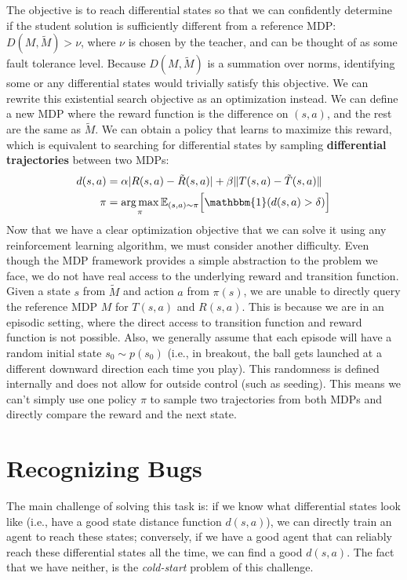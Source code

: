 \documentclass{article}
\newcommand{\E}{\mathbb{E}}
\DeclareMathOperator*{\argmax}{arg\,max}
\newcommand{\PIECH}[1]{#1}%
\begin{document}
The objective is to reach differential states so that we can confidently \PIECH{determine if the student solution is sufficiently different from a reference MDP:} $D(M, \tilde M) > \nu$, where $\nu$ is chosen by the teacher, and can be thought of as some fault tolerance level. Because $D(M, \tilde M)$ is a summation over norms, identifying some or any differential states would trivially satisfy this objective. We can rewrite this existential search objective as an optimization instead. We can define a new MDP where the reward function is the difference on $(s, a)$, and the rest are the same as $\tilde M$. We can obtain a policy that learns to maximize this reward, which is equivalent to searching for differential states by sampling \textbf{differential trajectories} between two MDPs: 
\begin{align}
d(s, a) &= \alpha |R(s, a) - \tilde R(s, a)| + \beta \| T(s, a) - \tilde T(s, a) \| \label{eq:state_distance} \\
\pi &= \argmax_\pi \E_{(s, a) \sim \pi} \Big[ \mathbbm{1}(d(s, a) > \delta) \Big] \label{eq:policy_search}
\end{align}
Now that we have a clear optimization objective that we can solve it using any reinforcement learning algorithm, we must consider another difficulty. Even though the MDP framework provides a simple abstraction to the problem we face, we do not have real access to the underlying reward and transition function. Given a state $s$ from $\tilde M$ and action $a$ from $\pi(s)$, we are unable to directly query the reference MDP $M$ for $T(s, a)$ and $R(s, a)$. This is because we are in an episodic setting, where the direct access to transition function and reward function is not possible. Also, we generally assume that each episode will have a random initial state $s_0 \sim p(s_0)$ (i.e., in breakout, the ball gets launched at a different downward direction each time you play). This randomness is defined internally and does not allow for outside control (such as seeding). This means we can't simply use one policy $\pi$ to sample two trajectories from both MDPs and directly compare the reward and the next state.





\section{Recognizing Bugs}
\vspace{-2mm} 

The main challenge of solving this task is: if we know what differential states look like (i.e., have a good state distance function $d(s, a)$), we can directly train an agent to reach these states; conversely, if we have a good agent that can reliably reach these differential states all the time, we can find a good $d(s, a)$. The fact that we have neither, is the \textit{cold-start} problem of this challenge. 
\end{document}
